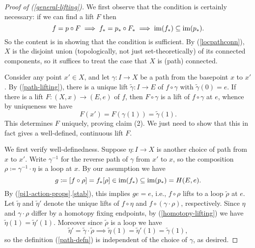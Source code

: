\begin{proof}[Proof of (\ref{general-lifting})]
  We first observe that the condition is certainly necessary: if we
  can find a lift $F$ then
  \[
  f = p \circ F \implies f_* = p_* \circ F_* \implies \operatorname{im}(f_*)
  \subseteq \operatorname{im}(p_*).
  \]
  So the content is in showing that the condition is sufficient. By
  (\ref{locpathconn}), $X$ is the disjoint union (topologically, not
  just set-theoretically) of its connected components, so it suffices
  to treat the case that $X$ is (path) connected.

  Consider any point $x' \in X$, and let $\gamma : I \to X$ be a path
  from the basepoint $x$ to $x'$. By (\ref{path-lifting}), there is a
  unique lift $\tilde\gamma : I \to E$ of $f \circ \gamma$ with
  $\tilde\gamma(0) = e$. If there is a lift $F : (X,x) \to (E,e)$ of
  $f$, then $F \circ \gamma$ is a lift of $f \circ \gamma$ at $e$,
  whence by uniqueness we have
  \begin{equation}
    \label{path-defn}
    F(x') = F(\gamma(1)) = \tilde\gamma(1).
  \end{equation}
  This determines $F$ uniquely, proving claim (2). We just need to
  show that this in fact gives a well-defined, continuous lift $F$.

  We first verify well-definedness. Suppose $\eta : I \to X$ is
  another choice of path from $x$ to $x'$. Write $\gamma^{-1}$ for the
  reverse path of $\gamma$ from $x'$ to $x$, so the composition $\rho
  \coloneqq \gamma^{-1} \cdot \eta$ is a loop at $x$. By our
  assumption we have
  \[
  g \coloneqq [f \circ \rho] = f_*[\rho] \in \operatorname{im}(f_*) \subseteq
  \operatorname{im}(p_*) = H(E,e).
  \]
  By (\ref{pi1-action-props}.\ref{stab}), this implies $ge = e$, i.e.,
  $f \circ \rho$ lifts to a loop $\tilde\rho$ at $e$. Let $\tilde\eta$
  and $\tilde\eta'$ denote the unique lifts of $f \circ \eta$ and $f
  \circ (\gamma \cdot \rho)$, respectively. Since $\eta$ and $\gamma
  \cdot \rho$ differ by a homotopy fixing endpoints, by
  (\ref{homotopy-lifting}) we have $\tilde\eta(1) =
  \tilde\eta'(1)$. Moreover since $\tilde\rho$ is a loop we have
  \[
  \tilde\eta' = \tilde\gamma \cdot \tilde\rho \implies \tilde\eta(1)=
  \tilde\eta'(1) = \tilde\gamma(1),
  \]
  so the definition (\ref{path-defn}) is independent of the choice of
  $\gamma$, as desired.


\end{proof}
